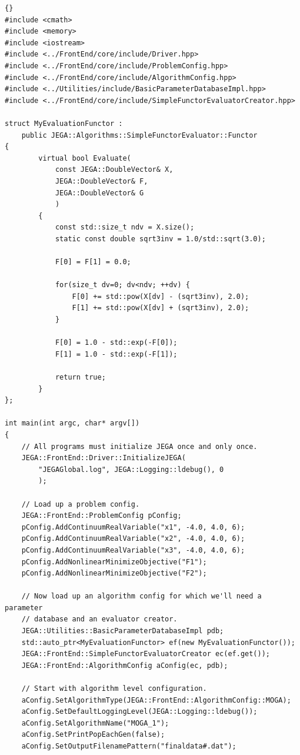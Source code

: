 \begin{lstlisting}[firstnumber=1,stepnumber=5,frame=single]{}
#include <cmath>
#include <memory>
#include <iostream>
#include <../FrontEnd/core/include/Driver.hpp>
#include <../FrontEnd/core/include/ProblemConfig.hpp>
#include <../FrontEnd/core/include/AlgorithmConfig.hpp>
#include <../Utilities/include/BasicParameterDatabaseImpl.hpp>
#include <../FrontEnd/core/include/SimpleFunctorEvaluatorCreator.hpp>

struct MyEvaluationFunctor :
    public JEGA::Algorithms::SimpleFunctorEvaluator::Functor
{
        virtual bool Evaluate(
            const JEGA::DoubleVector& X,
            JEGA::DoubleVector& F,
            JEGA::DoubleVector& G
            )
        {
            const std::size_t ndv = X.size();
            static const double sqrt3inv = 1.0/std::sqrt(3.0);

            F[0] = F[1] = 0.0;

            for(size_t dv=0; dv<ndv; ++dv) {
                F[0] += std::pow(X[dv] - (sqrt3inv), 2.0);
                F[1] += std::pow(X[dv] + (sqrt3inv), 2.0);
            }

            F[0] = 1.0 - std::exp(-F[0]);
            F[1] = 1.0 - std::exp(-F[1]);

            return true;
        }
};

int main(int argc, char* argv[])
{
    // All programs must initialize JEGA once and only once.
    JEGA::FrontEnd::Driver::InitializeJEGA(
        "JEGAGlobal.log", JEGA::Logging::ldebug(), 0
        );

    // Load up a problem config.
    JEGA::FrontEnd::ProblemConfig pConfig;
    pConfig.AddContinuumRealVariable("x1", -4.0, 4.0, 6);
    pConfig.AddContinuumRealVariable("x2", -4.0, 4.0, 6);
    pConfig.AddContinuumRealVariable("x3", -4.0, 4.0, 6);
    pConfig.AddNonlinearMinimizeObjective("F1");
    pConfig.AddNonlinearMinimizeObjective("F2");

    // Now load up an algorithm config for which we'll need a parameter
    // database and an evaluator creator.
    JEGA::Utilities::BasicParameterDatabaseImpl pdb;
    std::auto_ptr<MyEvaluationFunctor> ef(new MyEvaluationFunctor());
    JEGA::FrontEnd::SimpleFunctorEvaluatorCreator ec(ef.get());
    JEGA::FrontEnd::AlgorithmConfig aConfig(ec, pdb);

    // Start with algorithm level configuration.
    aConfig.SetAlgorithmType(JEGA::FrontEnd::AlgorithmConfig::MOGA);
    aConfig.SetDefaultLoggingLevel(JEGA::Logging::ldebug());
    aConfig.SetAlgorithmName("MOGA_1");
    aConfig.SetPrintPopEachGen(false);
    aConfig.SetOutputFilenamePattern("finaldata#.dat");


\end{lstlisting}
